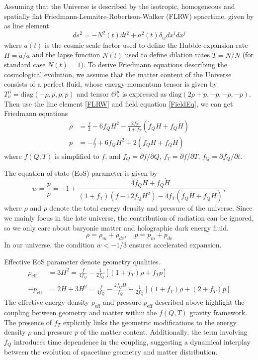 \documentclass[manuscript]{aastex631}
\begin{document}
Assuming that the Universe is described by the isotropic, homogeneous and spatially flat Friedmann-Lemaitre-Robertson-Walker (FLRW) spacetime, given by as line element
\begin{equation}
ds^2=-N^2(t)dt^2+a^2(t)\delta_{ij} dx^i dx^j\label{FLRW}
\end{equation}
where $a(t)$ is the cosmic scale factor
used to define the Hubble expansion rate $H=\dot{a}/a$ and the lapse function $N(t)$ used to define dilation rates $\tilde{T}=\dot{N}/N$ (for standard case $N(t)=1$). To derive Friedmann equations describing the cosmological evolution, we assume that the matter content of the Universe consists of a perfect fluid, whose  energy-momentum tensor is given by $T^{\mu}_\nu=\text{diag}(-\rho,p,p,p)$ and tensor $\Theta^{\mu}_\nu$ is expressed as $\text{diag}(2\rho+p,-p,-p,-p)$. Then use the line element \eqref{FLRW} and field equation \eqref{FieldEq}, we can get Friedmann equations
\begin{align}
\rho &=\frac{f}{2}-6f_Q H^2-\frac{2f_T}{1+f_T}(\dot{f}_QH+f_Q \dot{H}) \\
p &=-\frac{f}{2}+6f_Q H^2+2(\dot{f}_QH+f_Q \dot{H})
\end{align}
where $f(Q,T)$ is simplified to $f$, and $f_Q=\partial f/\partial Q$, $f_T=\partial f/\partial T$, $\dot{f}_Q=\partial f_Q/\partial t$.

The equation of state (EoS) parameter is given by
\begin{equation}
    w=\frac{p}{\rho}=-1+\frac{4 f_Q H+f_Q \dot{H}}{(1+f_T)(f-12f_QH^2)-4 f_T(\dot{f}_QH+f_Q \dot{H})},
\end{equation}
where $\rho$ and $p$ denote the total energy density and pressure of the universe. Since we mainly focus in the late universe, the contribution of radiation can be ignored, so we only care about baryonic matter and holographic dark energy fluid.
\begin{equation}
    \rho=\rho_m+\rho_{de}, \quad p=p_m+p_{de}
\end{equation}
In our universe, the condition $w < -1/3$ ensures accelerated expansion. 

Effective EoS parameter denote geometry qualities.
\begin{align}
\rho_{\text{eff}}&=3H^2=\frac{f}{4f_Q}-\frac{1}{2f_Q}[(1+f_T)\rho+f_T p] \label{F1}\\
-p_{\text{eff}}&=2\dot{H}+3H^2=\frac{f}{4f_Q}-\frac{2\dot{f}_Q H}{f_Q}+\frac{1}{2f_Q}[(1+f_T)\rho +(2+f_T)p] \label{F2}
\end{align}
The effective energy density \(\rho_{\text{eff}}\) and pressure \(p_{\text{eff}}\) described above highlight the coupling between geometry and matter within the \(f(Q, T)\) gravity framework. The presence of \(f_T\) explicitly links the geometric modifications to the energy density \(\rho\) and pressure \(p\) of the matter content. Additionally, the term involving \(\dot{f}_Q\) introduces time dependence in the coupling, suggesting a dynamical interplay between the evolution of spacetime geometry and matter distribution. 
\end{document}
